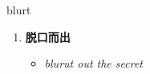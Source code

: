 
\begin{frame}
{\huge blurt}
\begin{center}
\begin{enumerate}\Large
  \item \textbf{脱口而出}
  \begin{itemize}
    \item \em{\Large{blurut out the secret}}
  \end{itemize}
\end{enumerate}
\end{center}
\end{frame}
